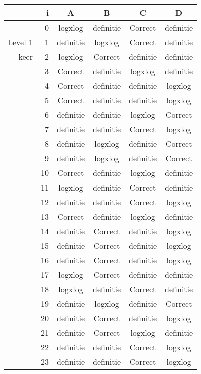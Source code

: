 \begin{tabular}{ rr| c|c|c|c}\hline\hline
     & i & \textbf{A} & \textbf{B} & \textbf{C} & \textbf{D}\\\hline

&0&logxlog&definitie&Correct\cellcolor[gray]{0.6}&definitie\\
Level 1 & 1&definitie&logxlog&Correct\cellcolor[gray]{0.6}&definitie\\
keer &2&logxlog&Correct\cellcolor[gray]{0.6}&definitie&definitie\\
&3&Correct\cellcolor[gray]{0.6}&definitie&logxlog&definitie\\
&4&Correct\cellcolor[gray]{0.6}&definitie&definitie&logxlog\\
&5&Correct\cellcolor[gray]{0.6}&definitie&definitie&logxlog\\
&6&definitie&definitie&logxlog&Correct\cellcolor[gray]{0.6}\\
&7&definitie&definitie&Correct\cellcolor[gray]{0.6}&logxlog\\
&8&definitie&logxlog&definitie&Correct\cellcolor[gray]{0.6}\\
&9&definitie&logxlog&definitie&Correct\cellcolor[gray]{0.6}\\
&10&Correct\cellcolor[gray]{0.6}&definitie&logxlog&definitie\\
&11&logxlog&definitie&Correct\cellcolor[gray]{0.6}&definitie\\
&12&definitie&definitie&Correct\cellcolor[gray]{0.6}&logxlog\\
&13&Correct\cellcolor[gray]{0.6}&definitie&logxlog&definitie\\
&14&definitie&Correct\cellcolor[gray]{0.6}&definitie&logxlog\\
&15&definitie&Correct\cellcolor[gray]{0.6}&definitie&logxlog\\
&16&definitie&Correct\cellcolor[gray]{0.6}&definitie&logxlog\\
&17&logxlog&Correct\cellcolor[gray]{0.6}&definitie&definitie\\
&18&logxlog&definitie&Correct\cellcolor[gray]{0.6}&definitie\\
&19&definitie&logxlog&definitie&Correct\cellcolor[gray]{0.6}\\
&20&definitie&Correct\cellcolor[gray]{0.6}&definitie&logxlog\\
&21&definitie&Correct\cellcolor[gray]{0.6}&logxlog&definitie\\
&22&definitie&definitie&Correct\cellcolor[gray]{0.6}&logxlog\\
&23&definitie&definitie&Correct\cellcolor[gray]{0.6}&logxlog\\
\hline\end{tabular}\par\ \newline

